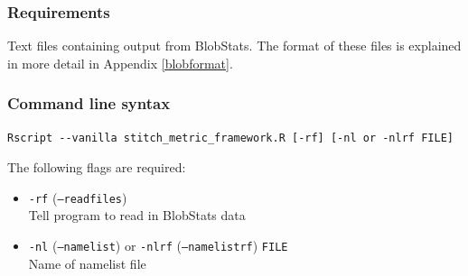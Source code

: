 \documentclass{article}
\begin{document}
\subsubsection{Requirements}
Text files containing output from BlobStats. The format of these files is explained in more detail in Appendix \ref{blobformat}.

\subsubsection{Command line syntax}
\begin{verbatim}
Rscript --vanilla stitch_metric_framework.R [-rf] [-nl or -nlrf FILE]
\end{verbatim}

The following flags are required:
\begin{itemize}
\item[] \texttt{-rf} (\texttt{--readfiles}) \\ Tell program to read in BlobStats data
\item[]\texttt{-nl} (\texttt{--namelist}) or \texttt{-nlrf} (\texttt{--namelistrf}) \texttt{FILE}\\ Name of namelist file
\end{itemize}
\end{document}
